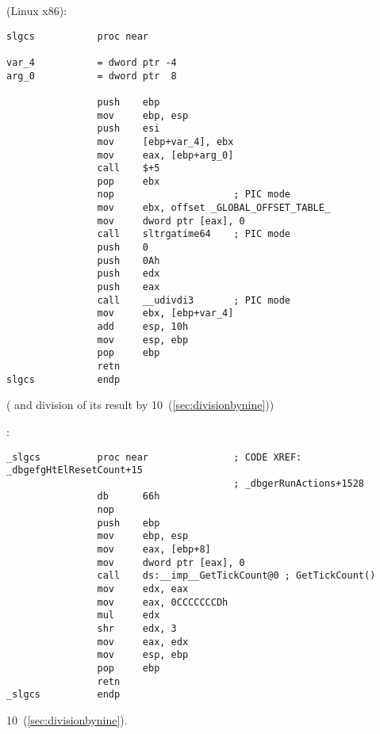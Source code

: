   (Linux x86):

\begin{lstlisting}
slgcs           proc near

var_4           = dword ptr -4
arg_0           = dword ptr  8

                push    ebp
                mov     ebp, esp
                push    esi
                mov     [ebp+var_4], ebx
                mov     eax, [ebp+arg_0]
                call    $+5
                pop     ebx
                nop                     ; PIC mode
                mov     ebx, offset _GLOBAL_OFFSET_TABLE_
                mov     dword ptr [eax], 0
                call    sltrgatime64    ; PIC mode
                push    0
                push    0Ah
                push    edx
                push    eax
                call    __udivdi3       ; PIC mode
                mov     ebx, [ebp+var_4]
                add     esp, 10h
                mov     esp, ebp
                pop     ebp
                retn
slgcs           endp
\end{lstlisting}

(  
{and division of its result by} 10~(\ref{sec:divisionbynine}))

:

\begin{lstlisting}
_slgcs          proc near               ; CODE XREF: _dbgefgHtElResetCount+15
                                        ; _dbgerRunActions+1528
                db      66h
                nop
                push    ebp
                mov     ebp, esp
                mov     eax, [ebp+8]
                mov     dword ptr [eax], 0
                call    ds:__imp__GetTickCount@0 ; GetTickCount()
                mov     edx, eax
                mov     eax, 0CCCCCCCDh
                mul     edx
                shr     edx, 3
                mov     eax, edx
                mov     esp, ebp
                pop     ebp
                retn
_slgcs          endp
\end{lstlisting}

  
 10~(\ref{sec:divisionbynine}).


